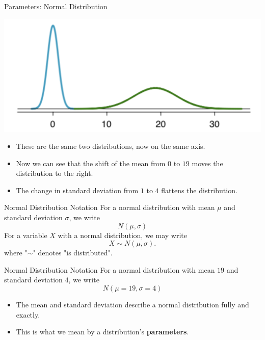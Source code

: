 \begin{frame}{Parameters: Normal Distribution}
    \begin{center}
        \includegraphics[scale=0.5]{images/meansd_nrml.png}
    \end{center}
    \vspace{-12pt}\begin{itemize}
        \item These are the same two distributions, now on the same axis.
        \item Now we can see that the shift of the mean from $0$ to $19$ moves the distribution to the right.
        \item The change in standard deviation from $1$ to $4$ flattens the distribution.
    \end{itemize}
\end{frame}

\begin{frame}{Normal Distribution Notation}
    For a normal distribution with mean $\mu$ and standard deviation $\sigma$, we write
    \[
        N(\mu, \sigma)
    \]
    For a variable $X$ with a normal distribution, we may write
    \[
        X \sim N(\mu, \sigma).
    \]
    where "$\sim$" denotes "is distributed".
\end{frame}

\begin{frame}{Normal Distribution Notation}
    For a normal distribution with mean $19$ and standard deviation $4$, we write
    \[
        N(\mu=19, \sigma=4)
    \]
    \begin{itemize}
        \item The mean and standard deviation describe a normal distribution fully and exactly. 
        \item This is what we mean by a distribution's \textbf{parameters}.
    \end{itemize}
\end{frame}

